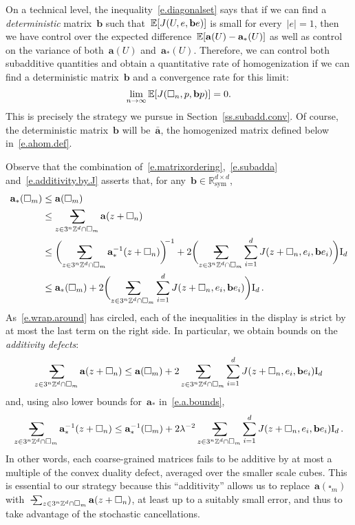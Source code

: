 \documentclass[11pt,twoside]{article} %
\makeatletter
\let\oldsquare\square %
\renewcommand{\square}{\oldsquare}
\numberwithin{equation}{section}
\theoremstyle{definition}
\let\originalleft\left
\let\originalright\right
\renewcommand{\left}{\mathopen{}\mathclose\bgroup\originalleft}
\renewcommand{\right}{\aftergroup\egroup\originalright}
\newcommand*{\Id}{\ensuremath{\mathrm{I}_d}}
\newcommand*{\R}{\ensuremath{\mathbb{R}}}
\newcommand*{\Zd}{\ensuremath{\mathbb{Z}^d}}
\renewcommand{\b}{\ensuremath{\mathbf{b}}}
\renewcommand{\a}{\mathbf{a}}
\newcommand{\ahom}{\bar{\a}}
\newcommand{\cu}{\square}
\newcommand{\E}{\mathbb{E}}
\newcommand{\avsum}{\mathop{\mathpalette\avsuminner\relax}\displaylimits}
\newcommand\avsuminner[2]{%
  {\sbox0{$\m@th#1\sum$}%
   \vphantom{\usebox0}%
   \ooalign{%
     \hidewidth
     \smash{\,\rule[.23em]{8.8pt}{1.1pt} \relax}%
     \hidewidth\cr
   ~$\m@th#1\sum$\cr
   }%
  }%
}
\newcommand{\avsumtext}{\mathop{\mathpalette\avsuminnerr\relax}\displaylimits}
\newcommand\avsuminnerr[2]{%
  {\sbox0{$\m@th#1\sum$}%
   \vphantom{\usebox0}%
   \ooalign{%
     \hidewidth
     \smash{\,\rule[.23em]{6pt}{0.7pt} \relax}%
     \hidewidth\cr
   ~$\m@th#1\sum$\cr
   }%
  }%
}
\makeatother
\begin{document}
\smallskip

On a technical level, the inequality~\eqref{e.diagonalset} says that if we can find a \emph{deterministic} matrix~$\b$ such that~$\E\left[ J(U,e,\b e) \right]$ is small for every~$|e|=1$, then we have control over the expected difference~$\E \left[ \a(U) - \a_*(U) \right]$ as well as control on the variance of both~$\a(U)$ and~$\a_*(U)$. 
Therefore, we can control both subadditive quantities and obtain a quantitative rate of homogenization if we can find a deterministic matrix~$\b$ and a convergence rate for this limit: 
\begin{equation} 
\label{e.Jtozero}
\lim_{n\to\infty} \E \left[ J(\cu_n,p,\b p) \right] = 0. 
\end{equation}
This is precisely the strategy we pursue in Section~\ref{ss.subadd.conv}. Of course, the deterministic matrix~$\b$ will be~$\ahom$, the homogenized matrix defined below in~\eqref{e.ahom.def}. 

\smallskip

Observe that the combination of~\eqref{e.matrixordering},~\eqref{e.subadda} and~\eqref{e.additivity.by.J} asserts that, for any~$\b\in \R^{d\times d}_{\mathrm{sym}}$,
\begin{align}
\label{e.wrap.around}
\a_*(\cu_m) 
& 
\leq 
\a(\cu_m) 
\notag \\ & 
\leq 
\avsum_{z\in 3^n\Zd \cap \cu_m} 
\a(z+\cu_n) 
\notag \\ & 
\leq 
\biggl(
\avsum_{z\in 3^n\Zd \cap \cu_m} 
\a_*^{-1}(z+\cu_n) 
\biggr)^{\!\!-1}
+ 2 \biggl (\avsum_{z\in 3^n\Zd\cap \cu_m}
\sum_{i=1}^d 
J(z+\cu_n,e_i,\b e_i) \biggr )\Id
\notag \\ & 
\leq 
\a_*(\cu_m) + 2\biggl ( \avsum_{z\in 3^n\Zd\cap \cu_m}
\sum_{i=1}^d 
J(z+\cu_n,e_i,\b e_i)\biggr )\Id
\,.
\end{align}
As~\eqref{e.wrap.around} has circled, each of the inequalities in the display is strict by at most the last term on the right side. In particular, we obtain bounds on the \emph{additivity defects}:
\begin{equation}
\label{e.add.defect.a}
\avsum_{z\in 3^n\Zd \cap \cu_m} 
\a(z+\cu_n) 
\leq 
\a(\cu_m) + 2 \avsum_{z\in 3^n\Zd\cap \cu_m}
\sum_{i=1}^d 
J(z+\cu_n,e_i,\b e_i) \Id
\end{equation}
and, using also lower bounds for~$\a_*$ in~\eqref{e.a.bounds},
\begin{equation}
\label{e.add.defect.astar}
\avsum_{z\in 3^n\Zd \cap \cu_m} 
\a_*^{-1}(z+\cu_n) 
\leq 
\a_*^{-1} (\cu_m) + 2 \lambda^{-2} \avsum_{z\in 3^n\Zd\cap \cu_m}
\sum_{i=1}^d 
J(z+\cu_n,e_i,\b e_i) \Id
\,.
\end{equation}
In other words, each coarse-grained matrices fails to be additive by at most a multiple of the convex duality defect, averaged over the smaller scale cubes. This is essential to our strategy because this ``additivity'' allows us to replace~$\a(\cu_m)$ with~$\avsumtext_{z\in 3^n\Zd \cap \cu_m} \a(z+\cu_n)$, at least up to a suitably small error, and thus to take advantage of the stochastic cancellations. 
\end{document}
